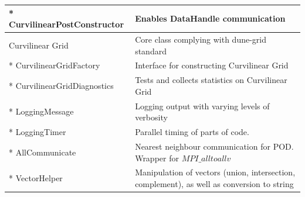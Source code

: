 \begin{tabularx}{\textwidth}{ l | X }
  * CurvilinearPostConstructor        & Enables DataHandle communication \\ \hline
  Curvilinear Grid                    & Core class complying with dune-grid standard \\ \hline
  * CurvilinearGridFactory            & Interface for constructing Curvilinear Grid \\ \hline
  * CurvilinearGridDiagnostics        & Tests and collects statistics on Curvilinear Grid \\ \hline
  * LoggingMessage                    & Logging output with varying levels of verbosity \\ \hline
  * LoggingTimer                      & Parallel timing of parts of code. \\ \hline
  * AllCommunicate                    & Nearest neighbour communication for POD. Wrapper for $MPI\_alltoallv$ \\ \hline
  * VectorHelper                      & Manipulation of vectors (union, intersection, complement), as well as conversion to string \\ \hline
\end{tabularx}
